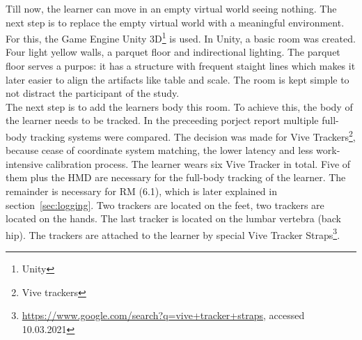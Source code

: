 Till now, the learner can move in an empty virtual world seeing nothing. The next step is to replace the empty virtual world with a meaningful environment. For this, the Game Engine Unity 3D\footnote{Unity} is used. In Unity, a basic room was created. Four light yellow walls, a parquet floor and indirectional lighting. The parquet floor serves a purpos: it has a structure with frequent staight lines which makes it later easier to align the artifacts like table and scale. The room is kept simple to not distract the participant of the study.\\

The next step is to add the learners body this room. To achieve this, the body of the learner needs to be tracked. In the preceeding porject report multiple full-body tracking systems were compared. The decision was made for Vive Trackers\footnote{Vive trackers}, because cease of coordinate system matching, the lower latency and less work-intensive calibration process. The learner wears six Vive Tracker in total. Five of them plus the HMD are necessary for the full-body tracking of the learner. The remainder is necessary for RM (6.1), which is later explained in section~\ref{sec:logging}. Two trackers are located on the feet, two trackers are located on the hands. The last tracker is located on the lumbar vertebra (back hip). The trackers are attached to the learner by special Vive Tracker Straps\footnote{\href{https://www.google.com/search?q=vive+tracker+straps}{https://www.google.com/search?q=vive+tracker+straps}, accessed 10.03.2021}.\\
